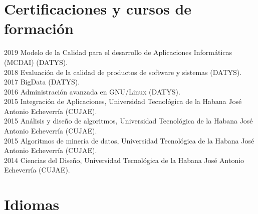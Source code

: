 \documentclass[letterpaper]{twentysecondcv} %
\begin{document}
\section{Certificaciones y cursos de formación}

\begin{twenty} %
\twentyitem
    	{2019}
		{}
        {Modelo de la Calidad para el desarrollo de Aplicaciones Informáticas (MCDAI) (DATYS).}
        {}
        {}
        {}
        \\
\twentyitem
    	{2018}
		{}
        {Evaluación de la calidad de productos de software y sistemas (DATYS).}
        {}
        {}
        {}
        \\
\twentyitem
    	{2017}
		{}
        {BigData (DATYS).}
        {}
        {}
        {}
        \\
\twentyitem
    	{2016}
		{}
        {Administración avanzada en GNU/Linux (DATYS).}
        {}
        {}
        {}
        \\
\twentyitem
    	{2015}
		{}
        {Integración de Aplicaciones, Universidad Tecnológica de la Habana José Antonio
Echeverría (CUJAE).}
        {}
        {}
        {}
        \\
\twentyitem
    	{2015}
		{}
        {Análisis y diseño de algoritmos, Universidad Tecnológica de la Habana José Antonio
Echeverría (CUJAE).}
        {}
        {}
        {}
        \\
\twentyitem
    	{2015}
		{}
        {Algoritmos de minería de datos, Universidad Tecnológica de la Habana José Antonio
Echeverría (CUJAE).}
        {}
        {}
        {}
        \\
\twentyitem
    	{2014}
		{}
        {Ciencias del Diseño, Universidad Tecnológica de la Habana José Antonio
Echeverría (CUJAE).}
        {}
        {}
        {}

\end{twenty}
\section{Idiomas}
\end{document}
